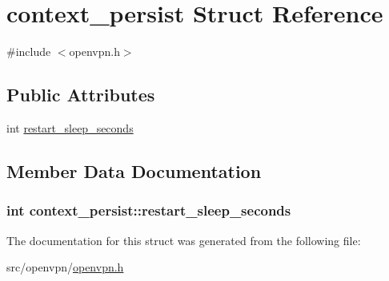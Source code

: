 \hypertarget{structcontext__persist}{}\section{context\+\_\+persist Struct Reference}
\label{structcontext__persist}


{\ttfamily \#include $<$openvpn.\+h$>$}

\subsection*{Public Attributes}
\begin{DoxyCompactItemize}
\item 
int \hyperlink{structcontext__persist_a737231b5a647b962d502b0379a4d4cc4}{restart\+\_\+sleep\+\_\+seconds}
\end{DoxyCompactItemize}


\subsection{Member Data Documentation}
\hypertarget{structcontext__persist_a737231b5a647b962d502b0379a4d4cc4}{}
\subsubsection[{restart\+\_\+sleep\+\_\+seconds}]{\setlength{\rightskip}{0pt plus 5cm}int context\+\_\+persist\+::restart\+\_\+sleep\+\_\+seconds}\label{structcontext__persist_a737231b5a647b962d502b0379a4d4cc4}


The documentation for this struct was generated from the following file\+:\begin{DoxyCompactItemize}
\item 
src/openvpn/\hyperlink{openvpn_8h}{openvpn.\+h}\end{DoxyCompactItemize}
